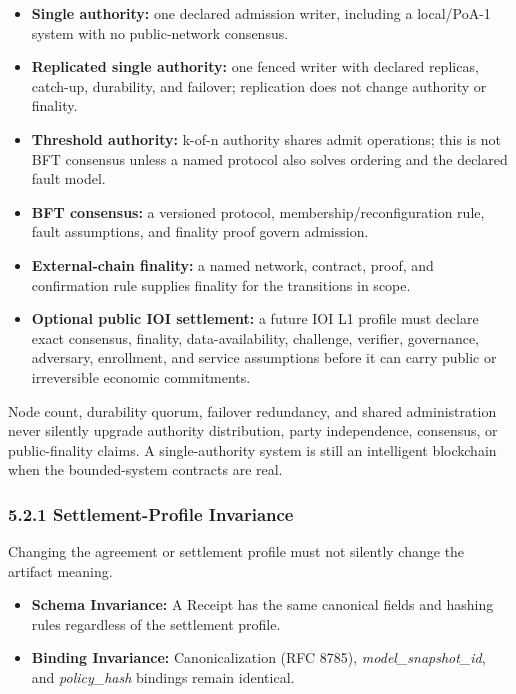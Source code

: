 \documentclass[
  11pt,
]{article}
\providecommand{\tightlist}{%
  \setlength{\itemsep}{0pt}\setlength{\parskip}{0pt}}
\begin{document}
\begin{itemize}
\tightlist
\item
  \textbf{Single authority:} one declared admission writer, including a
  local/PoA-1 system with no public-network consensus.
\item
  \textbf{Replicated single authority:} one fenced writer with declared
  replicas, catch-up, durability, and failover; replication does not change
  authority or finality.
\item
  \textbf{Threshold authority:} k-of-n authority shares admit operations;
  this is not BFT consensus unless a named protocol also solves ordering and
  the declared fault model.
\item
  \textbf{BFT consensus:} a versioned protocol, membership/reconfiguration
  rule, fault assumptions, and finality proof govern admission.
\item
  \textbf{External-chain finality:} a named network, contract, proof, and
  confirmation rule supplies finality for the transitions in scope.
\item
  \textbf{Optional public IOI settlement:} a future IOI L1 profile must declare
  exact consensus, finality, data-availability, challenge, verifier,
  governance, adversary, enrollment, and service assumptions before it can
  carry public or irreversible economic commitments.
\end{itemize}

Node count, durability quorum, failover redundancy, and shared administration
never silently upgrade authority distribution, party independence, consensus,
or public-finality claims. A single-authority system is still an intelligent
blockchain when the bounded-system contracts are real.

\hypertarget{driver-invariance-the-usb-c-rule}{%
\subsubsection{5.2.1 Settlement-Profile
Invariance}\label{driver-invariance-the-usb-c-rule}}

Changing the agreement or settlement profile must not silently change the
artifact meaning.

\begin{itemize}
\tightlist
\item
  \textbf{Schema Invariance:} A Receipt has the same canonical fields
  and hashing rules regardless of the settlement profile.
\item
  \textbf{Binding Invariance:} Canonicalization (RFC 8785),
  \emph{model\_snapshot\_id}, and \emph{policy\_hash} bindings remain
  identical.
\end{itemize}
\end{document}
